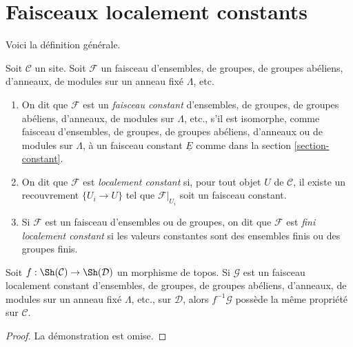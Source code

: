 



\section{Faisceaux localement constants}
\label{section-locally-constant}

\noindent
Voici la définition générale.

\begin{definition}
\label{definition-locally-constant}
Soit $\mathcal{C}$ un site. Soit $\mathcal{F}$ un faisceau d'ensembles, de
groupes, de groupes abéliens, d'anneaux, de modules sur un anneau fixé
$\Lambda$, etc.
\begin{enumerate}
\item On dit que $\mathcal{F}$ est un {\it faisceau constant} d'ensembles, de
groupes, de groupes abéliens, d'anneaux, de modules sur $\Lambda$, etc., s'il
est isomorphe, comme faisceau d'ensembles, de groupes, de groupes abéliens,
d'anneaux ou de modules sur $\Lambda$, à un faisceau
constant $\underline{E}$ comme dans la section \ref{section-constant}.
\item On dit que $\mathcal{F}$ est {\it localement constant} si, pour tout
objet $U$ de $\mathcal{C}$, il existe un recouvrement $\{U_i \to U\}$ tel que
$\mathcal{F}|_{U_i}$ soit un faisceau constant.
\item Si $\mathcal{F}$ est un faisceau d'ensembles ou de groupes, on dit que $\mathcal{F}$ est
{\it fini localement constant} si les valeurs constantes sont des ensembles
finis ou des groupes finis.
\end{enumerate}
\end{definition}

\begin{lemma}
\label{lemma-pullback-locally-constant}
Soit $f : \Sh(\mathcal{C}) \to \Sh(\mathcal{D})$ un morphisme de topos.
Si $\mathcal{G}$ est un faisceau localement constant d'ensembles, de groupes,
de groupes abéliens, d'anneaux, de modules sur un anneau fixé $\Lambda$, etc.,
sur $\mathcal{D}$, alors $f^{-1}\mathcal{G}$ possède la même propriété sur
$\mathcal{C}$.
\end{lemma}

\begin{proof}
La démonstration est omise.
\end{proof}

